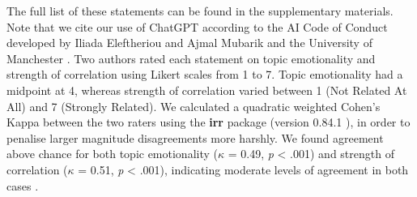 \documentclass[manuscript,screen,review]{acmart}
\begin{document}
The full list of these statements can be found in the supplementary
materials. Note that we cite our use of ChatGPT according to the AI Code
of Conduct developed by Iliada Eleftheriou and Ajmal Mubarik and the
University of Manchester \citep{iliada_2023}. Two authors rated each
statement on topic emotionality and strength of correlation using Likert
scales from 1 to 7. Topic emotionality had a midpoint at 4, whereas
strength of correlation varied between 1 (Not Related At All) and 7
(Strongly Related). We calculated a quadratic weighted Cohen's Kappa
between the two raters using the \textbf{irr} package (version 0.84.1
\citep{irr}), in order to penalise larger magnitude disagreements more
harshly. We found agreement above chance for both topic emotionality
(\(\kappa\) = 0.49, \emph{p} \textless{} .001) and strength of
correlation (\(\kappa\) = 0.51, \emph{p} \textless{} .001), indicating
moderate levels of agreement in both cases
\citep{cohen_1968, fleiss_1969}.
\end{document}
